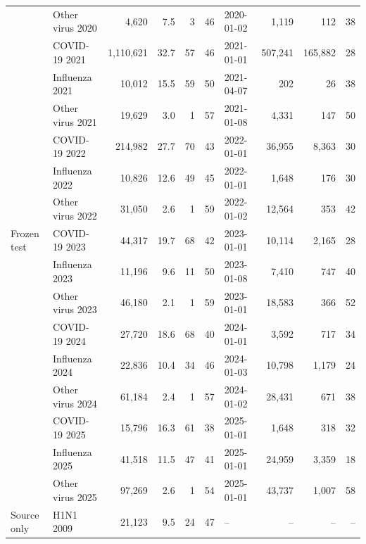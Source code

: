 \begin{table}[t]
{\begin{tabular}{llrrrrlrrr}
 & Other virus 2020 & 4,620 & 7.5 & 3 & 46 & 2020-01-02 & 1,119 & 112 & 38 \\
 & COVID-19 2021 & 1,110,621 & 32.7 & 57 & 46 & 2021-01-01 & 507,241 & 165,882 & 28 \\
 & Influenza 2021 & 10,012 & 15.5 & 59 & 50 & 2021-04-07 & 202 & 26 & 38 \\
 & Other virus 2021 & 19,629 & 3.0 & 1 & 57 & 2021-01-08 & 4,331 & 147 & 50 \\
 & COVID-19 2022 & 214,982 & 27.7 & 70 & 43 & 2022-01-01 & 36,955 & 8,363 & 30 \\
 & Influenza 2022 & 10,826 & 12.6 & 49 & 45 & 2022-01-01 & 1,648 & 176 & 30 \\
 & Other virus 2022 & 31,050 & 2.6 & 1 & 59 & 2022-01-02 & 12,564 & 353 & 42 \\
\midrule
Frozen test & COVID-19 2023 & 44,317 & 19.7 & 68 & 42 & 2023-01-01 & 10,114 & 2,165 & 28 \\
 & Influenza 2023 & 11,196 & 9.6 & 11 & 50 & 2023-01-08 & 7,410 & 747 & 40 \\
 & Other virus 2023 & 46,180 & 2.1 & 1 & 59 & 2023-01-01 & 18,583 & 366 & 52 \\
 & COVID-19 2024 & 27,720 & 18.6 & 68 & 40 & 2024-01-01 & 3,592 & 717 & 34 \\
 & Influenza 2024 & 22,836 & 10.4 & 34 & 46 & 2024-01-03 & 10,798 & 1,179 & 24 \\
 & Other virus 2024 & 61,184 & 2.4 & 1 & 57 & 2024-01-02 & 28,431 & 671 & 38 \\
 & COVID-19 2025 & 15,796 & 16.3 & 61 & 38 & 2025-01-01 & 1,648 & 318 & 32 \\
 & Influenza 2025 & 41,518 & 11.5 & 47 & 41 & 2025-01-01 & 24,959 & 3,359 & 18 \\
 & Other virus 2025 & 97,269 & 2.6 & 1 & 54 & 2025-01-01 & 43,737 & 1,007 & 58 \\
\midrule
Source only & H1N1 2009 & 21,123 & 9.5 & 24 & 47 & -- & -- & -- & -- \\
\bottomrule
\end{tabular}}
\end{table}
